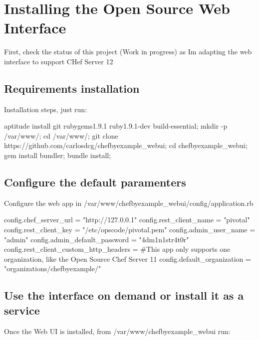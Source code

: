 \section{Installing the Open Source Web Interface}

First, check the status of this project (Work in progress) as 
Im adapting the web interface to support CHef Server 12

\subsection{Requirements installation}

Installation steps, just run:
\begin{codelisting}
\label{code:}
\codecaption{}
\begin{code}
aptitude install git rubygems1.9.1 ruby1.9.1-dev build-essential;
mkdir -p /var/www/; cd /var/www/; git clone https://github.com/carlosdcg/chefbyexample_webui; cd chefbyexample_webui;
gem install bundler;
bundle install;
\end{code}
\end{codelisting}

\subsection{Configure the default paramenters}

Configure the web app in /var/www/chefbyexample\_webui/config/application.rb

\begin{codelisting}
\label{code:}
\codecaption{}
\begin{code}
config.chef_server_url = "http://127.0.0.1"
config.rest_client_name = "pivotal"
config.rest_client_key = "/etc/opscode/pivotal.pem"
config.admin_user_name =  "admin"
config.admin_default_password = "4dm1n1str4t0r"
config.rest_client_custom_http_headers = {}
#This app only supports one organization, like the Open Source Chef Server 11
config.default_organization = "organizations/chefbyexample/"
\end{code}
\end{codelisting}

\subsection{Use the interface on demand or install it as a service}

Once the Web UI is installed, from /var/www/chefbyexample\_webui run:

